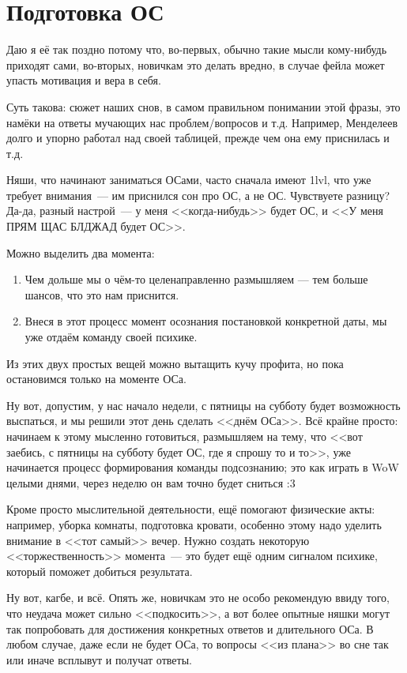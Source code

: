\documentclass[a5paper,12pt,twoside]{memoir}
\begin{document}
\chapter{Подготовка ОС}
Даю я её так поздно потому что, во-первых, обычно такие мысли кому-нибудь приходят сами, во-вторых, новичкам это делать вредно, в случае фейла может упасть мотивация и вера в себя. 

Суть такова: сюжет наших снов, в самом правильном понимании этой фразы, это намёки на ответы мучающих нас проблем/вопросов и т.д. Например, Менделеев долго и упорно работал над своей таблицей, прежде чем она ему приснилась и т.д.

Няши, что начинают заниматься ОСами, часто сначала имеют 1lvl, что уже требует внимания~--- им приснился сон про ОС, а не ОС. Чувствуете разницу? Да-да, разный настрой~--- у меня <<когда-нибудь>> будет ОС, и <<У меня ПРЯМ ЩАС БЛДЖАД будет ОС>>. 

Можно выделить два момента:
\begin{enumerate}
\item Чем дольше мы о чём-то целенаправленно размышляем — тем больше шансов, что это нам приснится. 
\item Внеся в этот процесс момент осознания постановкой конкретной даты, мы уже отдаём команду своей психике. 
\end{enumerate}

Из этих двух простых вещей можно вытащить кучу профита, но пока остановимся только на моменте ОСа. 

Ну вот, допустим, у нас начало недели, с пятницы на субботу будет возможность выспаться, и мы решили этот день сделать <<днём ОСа>>. Всё крайне просто: начинаем к этому мысленно готовиться, размышляем на тему, что <<вот заебись, с пятницы на субботу будет ОС, где я спрошу то и то>>, уже начинается процесс формирования команды подсознанию; это как играть в WoW целыми днями, через неделю он вам точно будет сниться :3 

Кроме просто мыслительной деятельности, ещё помогают физические акты: например, уборка комнаты, подготовка кровати, особенно этому надо уделить внимание в <<тот самый>> вечер. Нужно создать некоторую <<торжественность>> момента~--- это будет ещё одним сигналом психике, который поможет добиться результата. 

Ну вот, кагбе, и всё. Опять же, новичкам это не особо рекомендую ввиду того, что неудача может сильно <<подкосить>>, а вот более опытные няшки могут так попробовать для достижения конкретных ответов и длительного ОСа. В любом случае, даже если не будет ОСа, то вопросы <<из плана>> во сне так или иначе всплывут и получат ответы. 
\end{document}
